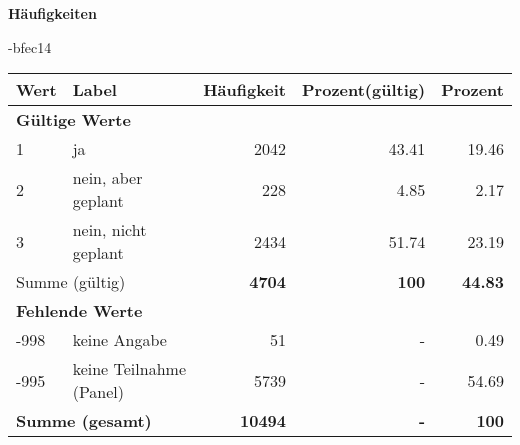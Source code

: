         		\vspace*{0.5cm}
                \noindent\textbf{Häufigkeiten}

                \vspace*{-\baselineskip}
					\begin{filecontents}{\jobname-bfec14}
					\begin{longtable}{lXrrr}
					\toprule
					\textbf{Wert} & \textbf{Label} & \textbf{Häufigkeit} & \textbf{Prozent(gültig)} & \textbf{Prozent} \\
					\endhead
					\midrule
					\multicolumn{5}{l}{\textbf{Gültige Werte}}\\

					1 &
					\multicolumn{1}{X}{ ja   } &


					  \num{2042} &
					  \num[round-mode=places,round-precision=2]{43,41} &
					    \num[round-mode=places,round-precision=2]{19,46} \\

					2 &
					\multicolumn{1}{X}{ nein, aber geplant   } &


					  \num{228} &
					  \num[round-mode=places,round-precision=2]{4,85} &
					    \num[round-mode=places,round-precision=2]{2,17} \\

					3 &
					\multicolumn{1}{X}{ nein, nicht geplant   } &


					  \num{2434} &
					  \num[round-mode=places,round-precision=2]{51,74} &
					    \num[round-mode=places,round-precision=2]{23,19} \\
					\midrule
					\multicolumn{2}{l}{Summe (gültig)} &
					  \textbf{\num{4704}} &
					\textbf{100} &
					  \textbf{\num[round-mode=places,round-precision=2]{44,83}} \\
					\multicolumn{5}{l}{\textbf{Fehlende Werte}}\\
							-998 &
							keine Angabe &
							  \num{51} &
							 - &
							  \num[round-mode=places,round-precision=2]{0,49} \\
							-995 &
							keine Teilnahme (Panel) &
							  \num{5739} &
							 - &
							  \num[round-mode=places,round-precision=2]{54,69} \\
					\midrule
					\multicolumn{2}{l}{\textbf{Summe (gesamt)}} &
				      \textbf{\num{10494}} &
				    \textbf{-} &
				    \textbf{100} \\
					\bottomrule
					\end{longtable}
					\end{filecontents}
